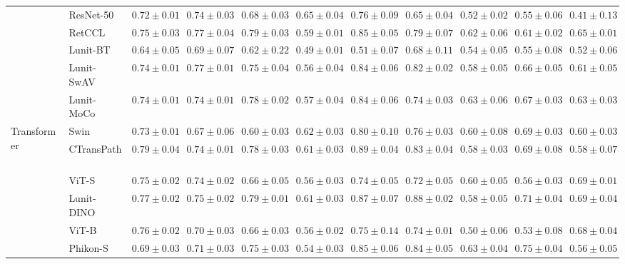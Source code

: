 \begin{tabular}{ll|cccc|c|cccc}
 & ResNet-50~\cite{he2015deep} & $0.72 \pm 0.01$ & $0.74 \pm 0.03$ & $0.68 \pm 0.03$ & $\mathbf{0.65 \pm 0.04}$ & $0.76 \pm 0.09$ & $0.65 \pm 0.04$ & $0.52 \pm 0.02$ & $0.55 \pm 0.06$ & $0.41 \pm 0.13$ \\
 & RetCCL~\cite{wang2023retccl} & $0.75 \pm 0.03$ & $0.77 \pm 0.04$ & $0.79 \pm 0.03$ & $0.59 \pm 0.01$ & $0.85 \pm 0.05$ & $0.79 \pm 0.07$ & $0.62 \pm 0.06$ & $0.61 \pm 0.02$ & $0.65 \pm 0.01$ \\
 & Lunit-BT~\cite{kang2023benchmarking} & $0.64 \pm 0.05$ & $0.69 \pm 0.07$ & $0.62 \pm 0.22$ & $0.49 \pm 0.01$ & $0.51 \pm 0.07$ & $0.68 \pm 0.11$ & $0.54 \pm 0.05$ & $0.55 \pm 0.08$ & $0.52 \pm 0.06$ \\
 & Lunit-SwAV~\cite{kang2023benchmarking} & $0.74 \pm 0.01$ & $0.77 \pm 0.01$ & $0.75 \pm 0.04$ & $0.56 \pm 0.04$ & $0.84 \pm 0.06$ & $0.82 \pm 0.02$ & $0.58 \pm 0.05$ & $0.66 \pm 0.05$ & $0.61 \pm 0.05$ \\
 & Lunit-MoCo~\cite{kang2023benchmarking} & $0.74 \pm 0.01$ & $0.74 \pm 0.01$ & $0.78 \pm 0.02$ & $0.57 \pm 0.04$ & $0.84 \pm 0.06$ & $0.74 \pm 0.03$ & $\mathbf{0.63 \pm 0.06}$ & $0.67 \pm 0.03$ & $0.63 \pm 0.03$ \\
\cline{1-11}
\multirow[t]{14}{*}{Transformer} & Swin~\cite{liu2021swin} & $0.73 \pm 0.01$ & $0.67 \pm 0.06$ & $0.60 \pm 0.03$ & $0.62 \pm 0.03$ & $0.80 \pm 0.10$ & $0.76 \pm 0.03$ & $0.60 \pm 0.08$ & $0.69 \pm 0.03$ & $0.60 \pm 0.03$ \\
 & CTransPath~\cite{wang2022transformer} & $0.79 \pm 0.04$ & $0.74 \pm 0.01$ & $0.78 \pm 0.03$ & $0.61 \pm 0.03$ & $0.89 \pm 0.04$ & $0.83 \pm 0.04$ & $0.58 \pm 0.03$ & $0.69 \pm 0.08$ & $0.58 \pm 0.07$ \\
 & ViT-S~\cite{kolesnikov2021image} & $0.75 \pm 0.02$ & $0.74 \pm 0.02$ & $0.66 \pm 0.05$ & $0.56 \pm 0.03$ & $0.74 \pm 0.05$ & $0.72 \pm 0.05$ & $0.60 \pm 0.05$ & $0.56 \pm 0.03$ & $\mathbf{0.69 \pm 0.01}$ \\
 & Lunit-DINO~\cite{kang2023benchmarking} & $0.77 \pm 0.02$ & $0.75 \pm 0.02$ & $0.79 \pm 0.01$ & $0.61 \pm 0.03$ & $0.87 \pm 0.07$ & $0.88 \pm 0.02$ & $0.58 \pm 0.05$ & $0.71 \pm 0.04$ & $0.69 \pm 0.04$ \\
 & ViT-B~\cite{kolesnikov2021image} & $0.76 \pm 0.02$ & $0.70 \pm 0.03$ & $0.66 \pm 0.03$ & $0.56 \pm 0.02$ & $0.75 \pm 0.14$ & $0.74 \pm 0.01$ & $0.50 \pm 0.06$ & $0.53 \pm 0.08$ & $0.68 \pm 0.04$ \\
 & Phikon-S~\cite{filiot2023scaling} & $0.69 \pm 0.03$ & $0.71 \pm 0.03$ & $0.75 \pm 0.03$ & $0.54 \pm 0.03$ & $0.85 \pm 0.06$ & $0.84 \pm 0.05$ & $0.63 \pm 0.04$ & $\mathbf{0.75 \pm 0.04}$ & $0.56 \pm 0.05$ \\

\end{tabular}
